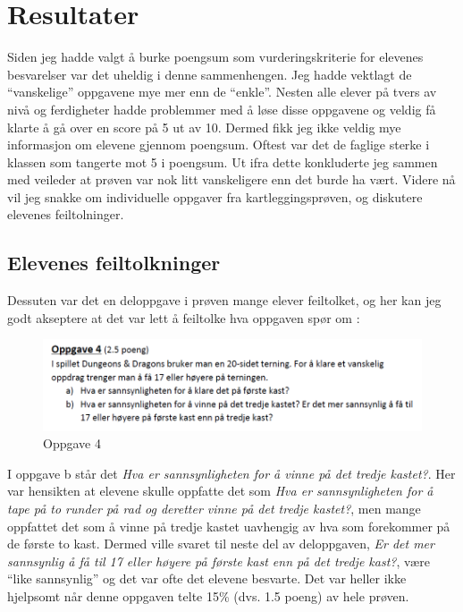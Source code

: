\documentclass[main.tex]{subfiles}
\begin{document}
\section*{Resultater}
\label{sec:4}

Siden jeg hadde valgt å burke poengsum som vurderingskriterie for elevenes besvarelser var det 
uheldig i denne sammenhengen. Jeg hadde vektlagt de ``vanskelige'' oppgavene mye mer enn de 
``enkle''. Nesten alle elever på tvers av nivå og ferdigheter hadde 
problemmer med å løse disse oppgavene og veldig få klarte å gå over en score på 5 ut av 10. Dermed fikk jeg ikke 
veldig mye informasjon om elevene gjennom poengsum. Oftest var det de faglige sterke i klassen som tangerte
mot 5 i poengsum. Ut ifra dette konkluderte jeg sammen med veileder at prøven var nok litt vanskeligere enn
det burde ha vært. Videre nå vil jeg snakke om individuelle oppgaver fra kartleggingsprøven, og diskutere 
elevenes feiltolninger.

\subsection*{Elevenes feiltolkninger}
Dessuten var det en deloppgave i prøven mange elever feiltolket, og her kan jeg godt
akseptere at det var lett å feiltolke hva oppgaven spør om :
\par
\begin{figure}[h!]
\centering
\includegraphics[scale = 0.7]{../figures/oppgave4b.png}
\caption{Oppgave 4}
\label{fig:oppgave4}
\end{figure}
I oppgave b står det \emph{Hva er sannsynligheten for å vinne på det tredje kastet?}. Her var hensikten at
elevene skulle oppfatte det som \emph{Hva er sannsynligheten for å tape på to runder på rad og deretter vinne på 
det tredje kastet?}, men mange oppfattet det som å vinne på tredje kastet uavhengig av hva som forekommer på de 
første to kast. Dermed ville svaret til neste del av deloppgaven, \emph{Er det mer sannsynlig å få til 17 eller 
høyere på første kast enn på det tredje kast?},  være ``like sannsynlig'' og det var ofte det elevene besvarte. 
Det var heller ikke hjelpsomt når denne oppgaven telte 15\% (dvs. 1.5 poeng) av hele prøven.  
\end{document}
